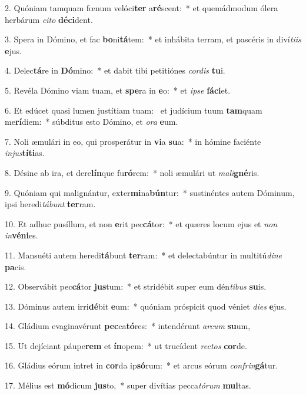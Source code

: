 2. Quóniam tamquam fœnum velóci\textbf{ter} a\textbf{ré}scent:~*  et quemádmodum ólera herbárum \textit{ci}\textit{to} \textbf{dé}\textbf{ci}dent.\

3. Spera in Dómino, et fac \textbf{bo}ni\textbf{tá}tem:~*  et inhábita terram, et pascéris in diví\textit{ti}\textit{is} \textbf{e}jus.\

4. Delec\textbf{tá}re in \textbf{Dó}mino:~*  et dabit tibi petitiónes \textit{cor}\textit{dis} \textbf{tu}i.\

5. Revéla Dómino viam tuam, et \textbf{spe}ra in \textbf{e}o:~*  et \textit{ip}\textit{se} \textbf{fá}\textbf{ci}et.\

6. Et edúcet quasi lumen justítiam tuam: \dag\  et judícium tuum \textbf{tam}quam me\textbf{rí}diem:~*  súbditus esto Dómino, et \textit{o}\textit{ra} \textbf{e}um.\

7. Noli æmulári in eo, qui prosperátur in \textbf{vi}a \textbf{su}a:~*  in hómine faciénte \textit{in}\textit{jus}\textbf{tí}\textbf{ti}as.\

8. Désine ab ira, et dere\textbf{lín}que fu\textbf{ró}rem:~*  noli æmulári ut \textit{ma}\textit{li}\textbf{gné}ris.\

9. Quóniam qui malignántur, exter\textbf{mi}na\textbf{bún}tur:~*  sustinéntes autem Dóminum, ipsi heredi\textit{tá}\textit{bunt} \textbf{ter}ram.\

10. Et adhuc pusíllum, et non \textbf{e}rit pec\textbf{cá}tor:~*  et quæres locum ejus et \textit{non} \textit{in}\textbf{vé}\textbf{ni}es.\

11. Mansuéti autem heredi\textbf{tá}bunt \textbf{ter}ram:~*  et delectabúntur in multitú\textit{di}\textit{ne} \textbf{pa}cis.\

12. Observábit pec\textbf{cá}tor \textbf{jus}tum:~*  et stridébit super eum dén\textit{ti}\textit{bus} \textbf{su}is.\

13. Dóminus autem irri\textbf{dé}bit \textbf{e}um:~*  quóniam próspicit quod véniet \textit{di}\textit{es} \textbf{e}jus.\

14. Gládium evaginavérunt \textbf{pec}ca\textbf{tó}res:~*  intendérunt \textit{ar}\textit{cum} \textbf{su}um,\

15. Ut dejíciant páupe\textbf{rem} et \textbf{ín}opem:~*  ut trucídent \textit{rec}\textit{tos} \textbf{cor}de.\

16. Gládius eórum intret in \textbf{cor}da ip\textbf{só}rum:~*  et arcus eórum \textit{con}\textit{frin}\textbf{gá}tur.\

17. Mélius est \textbf{mó}dicum \textbf{jus}to,~*  super divítias pecca\textit{tó}\textit{rum} \textbf{mul}tas.\

